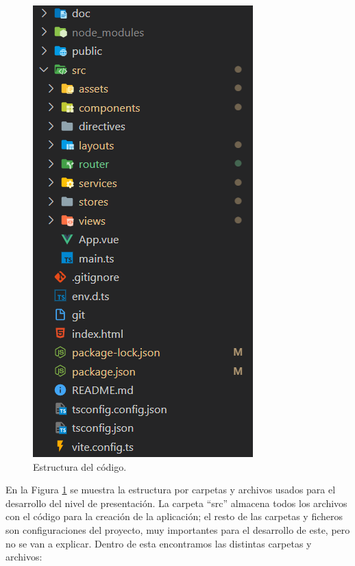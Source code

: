
\begin{figure}[htbp]
\centering
\includegraphics[scale=0.65]{Graphics/code}
\caption{Estructura del código.}
\label{fig:code}
\end{figure}

En la Figura \ref{fig:code} se muestra la estructura por carpetas y archivos usados para el desarrollo del nivel de presentación. La carpeta ``src'' almacena todos los archivos con el código para la creación de la aplicación; el resto de las carpetas y ficheros son configuraciones del proyecto, muy importantes para el desarrollo de este, pero no se van a explicar. Dentro de esta encontramos las distintas carpetas y archivos:

